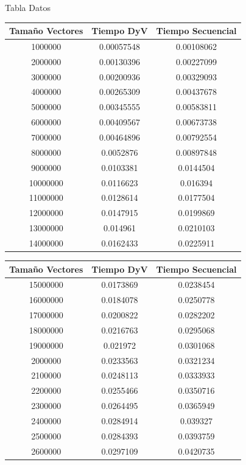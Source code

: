 \documentclass[12pt]{beamer}
\begin{document}
\begin{frame}{Tabla Datos}
\begin{tabular}{|c|c|c|}
\hline 
Tamaño Vectores & Tiempo DyV & Tiempo Secuencial \\ 
\hline 
1000000 & 0.00057548 & 0.00108062 \\ 
\hline 
2000000 & 0.00130396 & 0.00227099 \\ 
\hline 
3000000 & 0.00200936 & 0.00329093 \\ 
\hline 
4000000 & 0.00265309 & 0.00437678 \\ 
\hline 
5000000 & 0.00345555 & 0.00583811 \\ 
\hline 
6000000 & 0.00409567 & 0.00673738 \\ 
\hline 
7000000 & 0.00464896 & 0.00792554 \\ 
\hline 
8000000 & 0.0052876 & 0.00897848 \\ 
\hline 
9000000 & 0.0103381 & 0.0144504 \\ 
\hline 
10000000 & 0.0116623 & 0.016394 \\ 
\hline  
11000000 & 0.0128614 & 0.0177504 \\ 
\hline 
12000000 & 0.0147915 & 
0.0199869
 \\ 
\hline 
13000000 & 0.014961 & 
0.0210103
 \\ 
\hline 
14000000 & 0.0162433 & 
0.0225911
 \\ 
\hline 
\end{tabular} 

\end{frame}

\begin{frame}
\begin{tabular}{|c|c|c|}
\hline 
Tamaño Vectores & Tiempo DyV & Tiempo Secuencial \\ 
\hline 
15000000 & 0.0173869 & 
0.0238454
 \\ 
\hline 
16000000 & 0.0184078 & 
0.0250778
 \\ 
\hline 
17000000 & 0.0200822 & 
0.0282202
 \\ 
\hline 
18000000 & 0.0216763 & 
0.0295068
 \\ 
\hline 
19000000 & 0.021972 & 
0.0301068
 \\ 
\hline
2000000 & 0.0233563 & 
0.0321234
 \\ 
\hline 
2100000 & 0.0248113 & 
0.0333933
 \\ 
\hline
2200000 & 0.0255466 & 
0.0350716
 \\ 
\hline 
2300000 & 0.0264495 & 
0.0365949
 \\ 
\hline 
2400000 & 0.0284914 & 
0.039327
 \\ 
\hline 
2500000 & 0.0284393 & 
0.0393759
 \\ 
\hline 
2600000 & 0.0297109 & 
0.0420735
 \\ 
\hline 
\end{tabular} 
\end{frame}
\end{document}
